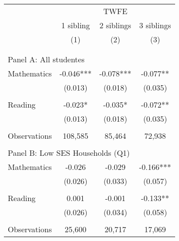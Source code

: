 \makeatletter
{}
{
\makeatother
\begin{tabular}{lccc}
\toprule
\cmidrule(lr){2-4}
& \multicolumn{3}{c}{TWFE} \\
\cmidrule(lr){2-4}
& 1 sibling & 2 siblings & 3 siblings  \\
\cmidrule(lr){2-2} \cmidrule(lr){3-3} \cmidrule(lr){4-4}
& (1) & (2) & (3)\\
\bottomrule
&  &  &  \\
&  &  &   \\
\multicolumn{4}{l}{Panel A: All studentes } \\
\hspace{3mm}Mathematics&      -0.046***&      -0.078***&      -0.077** \\
                    &     (0.013)   &     (0.018)   &     (0.035)   \\
 
&  &  &   \\
\hspace{3mm}Reading &      -0.023*  &      -0.035*  &      -0.072** \\
                    &     (0.013)   &     (0.018)   &     (0.035)   \\
                    &               &               &               \\
\hspace{3mm}Observations&     108,585   &      85,464   &      72,938   \\
 
&  &  &   \\
\multicolumn{4}{l}{Panel B: Low SES Households (Q1)} \\
\hspace{3mm}Mathematics&      -0.026   &      -0.029   &      -0.166***\\
                    &     (0.026)   &     (0.033)   &     (0.057)   \\
 
&  &  &   \\
\hspace{3mm}Reading &       0.001   &      -0.001   &      -0.133** \\
                    &     (0.026)   &     (0.034)   &     (0.058)   \\
                    &               &               &               \\
\hspace{3mm}Observations&      25,600   &      20,717   &      17,069   \\
 

\end{tabular}}
